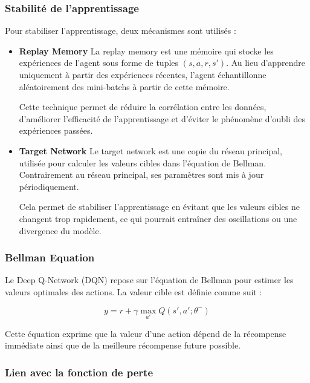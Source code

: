 \documentclass[12pt,a4paper]{report}
\begin{document}
\subsubsection{Stabilité de l’apprentissage}

Pour stabiliser l’apprentissage, deux mécanismes sont utilisés :
\begin{itemize}
    \item \textbf{Replay Memory} La replay memory est une mémoire qui stocke les expériences de l’agent sous forme de tuples $(s, a, r, s')$. Au lieu d’apprendre uniquement à partir des expériences récentes, l’agent échantillonne aléatoirement des mini-batchs à partir de cette mémoire.

    Cette technique permet de réduire la corrélation entre les données, d’améliorer l’efficacité de l’apprentissage et d’éviter le phénomène d’oubli des expériences passées. \\
    
    \item \textbf{Target Network} Le target network est une copie du réseau principal, utilisée pour calculer les valeurs cibles dans l’équation de Bellman. Contrairement au réseau principal, ses paramètres sont mis à jour périodiquement.

    Cela permet de stabiliser l’apprentissage en évitant que les valeurs cibles ne changent trop rapidement, ce qui pourrait entraîner des oscillations ou une divergence du modèle.
\end{itemize}

\subsubsection{Bellman Equation}

Le Deep Q-Network (DQN) repose sur l’équation de Bellman pour estimer les valeurs optimales des actions. La valeur cible est définie comme suit :

\begin{equation}
y = r + \gamma \max_{a'} Q(s', a'; \theta^{-})
\end{equation}

Cette équation exprime que la valeur d’une action dépend de la récompense immédiate ainsi que de la meilleure récompense future possible.

\subsubsection{Lien avec la fonction de perte}
\end{document}
